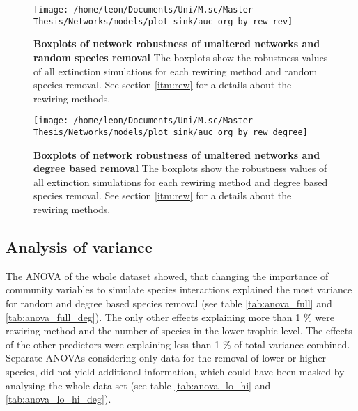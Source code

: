 \documentclass[12pt,a4paper]{article}
\begin{document}
\begin{figure}[H]
	 \centering
	 \texttt{[image: /home/leon/Documents/Uni/M.sc/Master Thesis/Networks/models/plot\_sink/auc\_org\_by\_rew\_rev]}
	 \captionsetup{width = \textwidth}
	 \caption[Boxplots of network robustness of unaltered networks and random species removal]{\textbf{Boxplots of network robustness of unaltered networks and random species removal} The boxplots show the robustness values of all extinction simulations for each rewiring method and random species removal. See section \ref{itm:rew} for a details about the rewiring methods.}
	 \label{fig:auc_org_rew}
\end{figure}




\begin{figure}[H]
	 \centering
	 \texttt{[image: /home/leon/Documents/Uni/M.sc/Master Thesis/Networks/models/plot\_sink/auc\_org\_by\_rew\_degree]}
	 \captionsetup{width = \textwidth}
	 \caption[Boxplots of network robustness of unaltered networks and degree based removal]{\textbf{Boxplots of network robustness of unaltered networks and degree based removal} The boxplots show the robustness values of all extinction simulations for each rewiring method and degree based species removal. See section \ref{itm:rew} for a details about the rewiring methods.}
	 \label{fig:auc_org_rew_deg}
\end{figure}

\subsection{Analysis of variance}

The ANOVA of the whole dataset showed, that changing the importance of community variables to simulate species interactions explained the most variance for random and degree based species removal (see table \ref{tab:anova_full} and \ref{tab:anova_full_deg}). The only other effects explaining more than 1 \% were rewiring method and the number of species in the lower trophic level. The effects of the other predictors were explaining less than 1 \% of total variance combined. Separate ANOVAs considering only data for the removal of lower or higher species, did not yield additional information, which could have been masked by analysing the whole data set (see table \ref{tab:anova_lo_hi} and \ref{tab:anova_lo_hi_deg}). \paragraph{}
\end{document}
